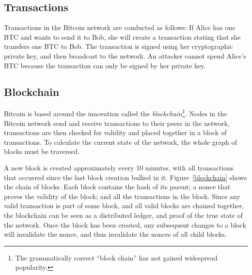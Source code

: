 \subsection{Transactions}
Transactions in the Bitcoin network are conducted as follows: If Alice has one BTC and wants to send it to Bob, she will create a transaction stating that she transfers one BTC to Bob. The transaction is signed using her cryptographic private key, and then broadcast to the network. An attacker cannot spend Alice's BTC because the transaction can only be signed by her private key.

\subsection{Blockchain}
Bitcoin is based around the innovation called the \emph{blockchain}\footnote{The grammatically correct ``block chain'' has not gained widespread popularity.}. Nodes in the Bitcoin network send and receive transactions to their peers in the network, transactions are then checked for validity and placed together in a block of transactions. To calculate the current state of the network, the whole graph of blocks must be traversed.

A new block is created approximately every 10 minutes, with all transactions that occurred since the last block creation bulked in it. Figure~\ref{blockchain} shows the chain of blocks. Each block contains the hash of its parent; a nonce that proves the validity of the block; and all the transactions in the block. Since any valid transaction is part of some block, and all valid blocks are chained together, the blockchain can be seen as a distributed ledger, and proof of the true state of the network. Once the block has been created, any subsequent changes to a block will invalidate the nonce, and thus invalidate the nonces of all child blocks.

